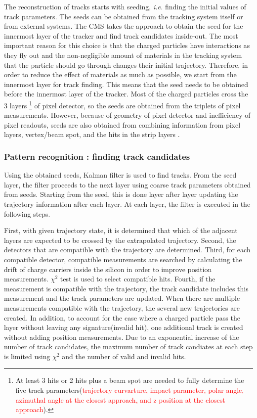 The reconstruction of tracks starts with seeding, \textit{i.e.} 
finding the initial values of track parameters. 
The seeds can be obtained from the tracking system itself or from external systems.  
The CMS takes the approach to obtain the seed for the innermost layer 
of the tracker and find track candidates inside-out. 
The most important reason for this choice is that the 
charged particles have interactions as they fly out
and the non-negligible amount of materials in the tracking system 
that the particle should go through changes their initial trajectory.
Therefore, in order to reduce the effect of materials as much as possible, 
we start from the innermost layer for track finding. 
This means that the seed needs to be obtained before the innermost 
layer of the tracker. Most of the charged particles cross the 3 layers 
\footnote{At least 3 hits or 2 hits plus a beam spot are needed to 
fully determine the five track parameters(\textcolor{red}{trajectory curvarture,
impact parameter, polar angle, azimuthal angle at the closest approach, 
and z position at the closest approach}).}
of pixel detector, so the seeds are obtained from the triplets of pixel measurements. 
However, because of geometry of pixel detector and inefficiency of pixel readouts, 
seeds are also obtained from combining information from pixel layers, 
vertex/beam spot, and the hits in the strip layers \cite{cmstdr1}.   

\subsubsection{Pattern recognition : finding track candidates}

Using the obtained seeds, Kalman filter \cite{} is used to find tracks. 
From the seed layer, the filter proceeds to the next layer using coarse 
track parameters obtained from seeds. Starting from the seed, this is done 
layer after layer updating the trajectory information after each layer. 
At each layer, the filter is executed in the following steps. 

First, with given trajectory state, 
it is determined that which of the adjacent layers are expected 
to be crossed by the extrapolated trajectory. Second, the detectors 
that are compatible with the trajectory are determined. Third, 
for each compatible detector, compatible measurements are searched 
by calculating the drift of charge carriers inside the silicon 
in order to improve position measurements. $\chi^2$ test is used 
to select compatible hits. Fourth, if the measurement is compatible 
with the trajectory, the track candidate includes this measurement 
and the track parameters are updated. When there are multiple measurements
compatible with the trajectory, the several new trajectories are 
created. In addition, to account for the case where a charged particle 
pass the layer without leaving any signature(invalid hit), one additional track is created
without adding position measurements.  
Due to an exponential increase of the number of track candidates, 
the maximum number of track candiates at each step is limited 
using $\chi^2$ and the number of valid and invalid hits. 

